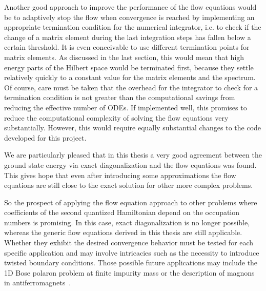 Another good approach to improve the performance of the flow equations would be to adaptively stop the flow when convergence is reached by implementing an appropriate termination condition for the numerical integrator, i.e. to check if the change of a matrix element during the last integration steps has fallen below a certain threshold. It is even conceivable to use different termination points for matrix elements. As discussed in the last section, this would mean that high energy parts of the Hilbert space would be terminated first, because they settle relatively quickly to a constant value for the matrix elements and the spectrum. Of course, care must be taken that the overhead for the integrator to check for a termination condition is not greater than the computational savings from reducing the effective number of ODEs. If implemented well, this promises to reduce the computational complexity of solving the flow equations very substantially. However, this would require equally substantial changes to the code developed for this project. \par
We are particularly pleased that in this thesis a very good agreement between the ground state energy via exact diagonalization and the flow equations was found. This gives hope that even after introducing some approximations the flow equations are still close to the exact solution for other more complex problems.\par
So the prospect of applying the flow equation approach to other problems where coefficients of the second quantized Hamiltonian depend on the occupation numbers is promising. In this case, exact diagonalization is no longer possible, whereas the generic flow equations derived in this thesis are still applicable. Whether they exhibit the desired convergence behavior must be tested for each specific application and may involve intricacies such as the necessity to introduce twisted boundary conditions. 
Those possible future applications may include the 1D Bose polaron problem at finite impurity mass or the description of magnons in \mbox{antiferromagnets \cite{Bermes_2023}}.
